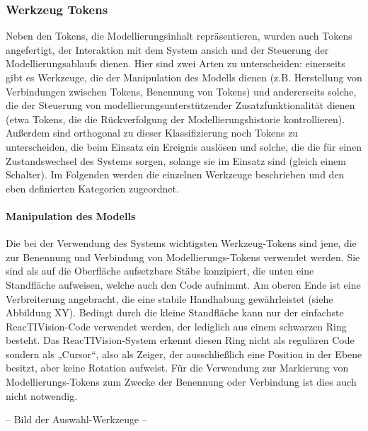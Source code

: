 
\subsubsection{Werkzeug Tokens} %
\label{ssub:werkzeug_tokens}

Neben den Tokens, die Modellierungsinhalt repräsentieren, wurden auch Tokens angefertigt, der Interaktion mit dem System ansich und der Steuerung der Modellierungsablaufs dienen. Hier sind zwei Arten zu unterscheiden: einerseits gibt es Werkzeuge, die der Manipulation des Modells dienen (z.B. Herstellung von Verbindungen zwischen Tokens, Benennung von Tokens) und andererseits solche, die der Steuerung von modellierungsunterstützender Zusatzfunktionalität dienen (etwa Tokens, die die Rückverfolgung der Modellierungshistorie kontrollieren). Außerdem sind orthogonal zu dieser Klassifizierung noch Tokens zu unterscheiden, die beim Einsatz ein Ereignis auslösen und solche, die die für einen Zustandswechsel des Systems sorgen, solange sie im Einsatz sind (gleich einem Schalter). Im Folgenden werden die einzelnen Werkzeuge beschrieben und den eben definierten Kategorien zugeordnet.

\paragraph{Manipulation des Modells} %
\label{par:manipulation_des_modells}

Die bei der Verwendung des Systems wichtigsten Werkzeug-Tokens sind jene, die zur Benennung und Verbindung von Modellierungs-Tokens verwendet werden. Sie sind als auf die Oberfläche aufsetzbare Stäbe konzipiert, die unten eine Standfläche aufweisen, welche auch den Code aufnimmt. Am oberen Ende ist eine Verbreiterung angebracht, die eine stabile Handhabung gewährleistet (siehe Abbildung XY). Bedingt durch die kleine Standfläche kann nur der einfachste ReacTIVision-Code verwendet werden, der lediglich aus einem schwarzen Ring besteht. Das ReacTIVision-System erkennt diesen Ring nicht als regulären Code sondern als „Cursor“, also als Zeiger, der ausschließlich eine Position in der Ebene besitzt, aber keine Rotation aufweist. Für die Verwendung zur Markierung von Modellierungs-Tokens zum Zwecke der Benennung oder Verbindung ist dies auch nicht notwendig.

-- Bild der Auswahl-Werkzeuge --

